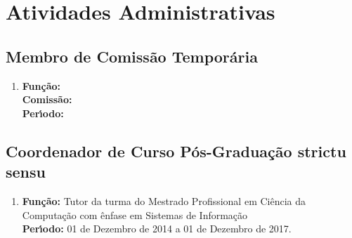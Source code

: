 \documentclass[a4paper,oneside,10pt]{article}
\begin{document}


\newpage
\section{Atividades Administrativas}
\vspace{0.3cm}


\subsection{Membro de Comiss\~{a}o Tempor\'{a}ria}
\vspace{0.3cm}

\begin{enumerate}
\renewcommand{\labelenumi}{{\large\bfseries\arabic{enumi}.}}


\item   \textbf{Fun\c{c}\~{a}o:} \\
        \textbf{Comiss\~{a}o:} \\
        \textbf{Per\'{\i}odo:} 

\end{enumerate}


\subsection{Coordenador de Curso Pós-Graduação \textbf{strictu sensu} }
\vspace{0.3cm}

\begin{enumerate}
\renewcommand{\labelenumi}{{\large\bfseries\arabic{enumi}.}}

\item   \textbf{Fun\c{c}\~{a}o:} Tutor da turma do Mestrado Profissional em Ciência da Computação com ênfase em Sistemas de Informação \\
        \textbf{Per\'{\i}odo:} 01 de Dezembro de 2014 a 01 de Dezembro de 2017.

\end{enumerate}

\end{document}
